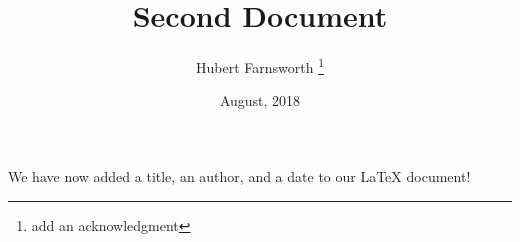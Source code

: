 \documentclass[12pt, letterpaper, twoside]{article}
\title{Second Document}
\author{Hubert Farnsworth \thanks{add an acknowledgment}}
\date{August, 2018}
\begin{document}
	
	\maketitle %
	
	We have now added a title, an author, and a date to our \LaTeX{} document!
\end{document}
